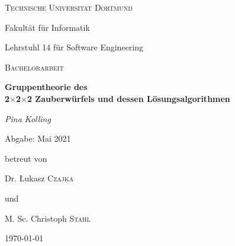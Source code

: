 \documentclass[12pt,a4paper, usenames, dvipsnames]{article}
\theoremstyle{mystyle}
\theoremstyle{definition}
\begin{document}


\begin{titlepage}
	\centering
	{\scshape\LARGE Technische Universität Dortmund \par}
	Fakultät für Informatik \par
	Lehrstuhl 14 für Software Engineering \par
	\vspace{1cm}
	{\scshape\Large Bachelorarbeit \par }
	\vspace{1.5cm}
	{\huge\bfseries  Gruppentheorie des \\ 2$\times$2$\times$2 Zauberwürfels und dessen Lösungsalgorithmen \par}
	\vspace{2cm}
	{\Large\itshape Pina Kolling\par}
	\vspace{0.5cm}
	{Abgabe: Mai 2021 \par }
	\vfill
	betreut von\par
	Dr. \L ukasz \textsc{Czajka} \par 
	und \par 
	M. Sc. Christoph \textsc{Stahl} 

	\vfill

	{\large \today\par}
\end{titlepage}

\setcounter{page}{1}



\begin{spacing}{0.45}



\tableofcontents

\end{spacing}








\newpage


\setcounter{page}{1} 
%

%
%
%
%
%
%
%
%
%
\end{document}
